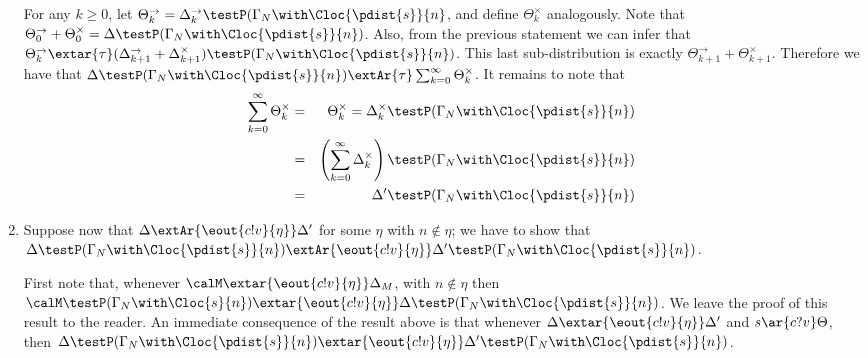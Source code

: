 \documentclass{LMCS}
\begin{document}
\begin{enumerate}
For any $k\geq 0$, let $\Theta_k^{\rightarrow} = \Delta_k^{\rightarrow} \testP (\Gamma_N \with 
\Cloc{\pdist{s}}{n}$, and define $\Theta_k^{\times}$ analogously. 
Note that $\Theta_0^{\rightarrow} + \Theta_0^{\times} = 
\Delta \testP (\Gamma_N \with \Cloc{\pdist{s}}{n})$. 
Also, from the previous statement we can infer that 
$\Theta_k^{\rightarrow} \extar{\tau} (\Delta_{k+1}^{\rightarrow} + \Delta_{k+1}^{\times})
\testP (\Gamma_N \with \Cloc{\pdist{s}}{n})$. This last sub-distribution is exactly 
$\Theta_{k+1}^{\rightarrow} + \Theta_{k+1}^{\times}$. Therefore we have that 
$\Delta \testP (\Gamma_N \with \Cloc{\pdist{s}}{n}) \extAr{\tau} 
\sum_{k=0}^{\infty} \Theta_{k}^{\times}$. It remains to note that 
\begin{eqnarray*}
\sum_{k=0}^{\infty} \Theta_{k}^{\times} &=&
\Theta_k^{\times} = \Delta_k^{\times} \testP (\Gamma_N \with 
\Cloc{\pdist{s}}{n})\\
&=& \left(\sum_{k=0}^{\infty} \Delta_k^{\times}\right) \testP (\Gamma_N \with 
\Cloc{\pdist{s}}{n})\\
&=& \Delta' \testP (\Gamma_N \with 
\Cloc{\pdist{s}}{n})\\
\end{eqnarray*}

\item Suppose now that $\Delta \extAr{\eout{c!v}{\eta}} \Delta'$ for some 
$\eta$ with $n \notin \eta$; we have to show 
that 
$\Delta \testP (\Gamma_N \with \Cloc{\pdist{s}}{n}) 
\extAr{\eout{c!v}{\eta}} \Delta' \testP (\Gamma_N \with \Cloc{\pdist{s}}{n})$. 

First note that, whenever $\calM \extar{\eout{c!v}{\eta}} \Delta_M$, with 
$n \notin \eta$ then $\calM \testP (\Gamma_N \with \Cloc{s}{n}) 
\extar{\eout{c!v}{\eta}} \Delta \testP (\Gamma_N \with \Cloc{\pdist{s}}{n})$. 
We leave the proof of this result to the reader. 
An immediate consequence of the result above is that whenever 
$\Delta \extar{\eout{c!v}{\eta}} \Delta'$ and $s \ar{c?v} \Theta$, then 
$\Delta \testP (\Gamma_N \with \Cloc{\pdist{s}}{n}) \extar{\eout{c!v}{\eta}} \Delta' 
\testP (\Gamma_N \with \Cloc{\pdist{s}}{n})$. 


\end{enumerate}
\end{document}
